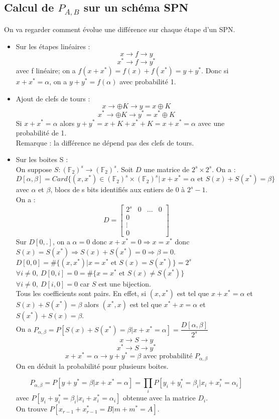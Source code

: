 \documentclass[12pt,a4paper]{report}
\begin{document}
\subsection{Calcul de $P_{A,B}$ sur un schéma SPN}
On va regarder comment évolue une différence sur chaque étape d'un SPN.
\begin{itemize}
\item Sur les étapes linéaires : 
$$ x \rightarrow f \rightarrow y $$
$$ x^* \rightarrow f \rightarrow y^* $$
avec f linéaire; on a $f(x+x^*)=f(x) + f(x^*) = y+y^*$. Donc si $x+x^*=\alpha$, on a $y+y^*=f(\alpha)$ avec probabilité 1.
\item Ajout de clefs de tours :
$$ x \rightarrow \oplus K \rightarrow y = x\oplus K $$
$$ x^* \rightarrow \oplus K \rightarrow y^* = x^* \oplus K$$
Si $x+x^*=\alpha$ alors $y+y^*=x+K+x^*+K = x+x^*=\alpha $ avec une probabilité de 1.\\
Remarque : la différence ne dépend pas des clefs de tours.
\item Sur les boites S : \\
On suppose $S:(\mathbb{F}_2)^s \rightarrow (\mathbb{F}_2)^s $. Soit $D$ une matrice de $2^s \times 2^s$. On a :
$$ D[\alpha,\beta] = Card\{(x,x^*)\in (\mathbb{F}_2)^s\times (\mathbb{F}_2)^s |\ x+x^*=\alpha \mbox{ et } S(x)+S(x^*)=\beta\}$$
avec $\alpha$ et $\beta$, blocs de s bits identifiés aux entiers de 0 à $2^s-1$.\\
On a :
$$ D = \left[\begin{array}{cccc}
2^s & 0 & \ldots & 0 \\
0 & & & \\
\vdots & & & \\
0 & & & \end{array}\right]$$
Sur $D[0,.]$, on a $\alpha=0$ donc $x+x^*=0 \Rightarrow x=x^*$ donc $S(x)=S(x^*) \Rightarrow S(x) +S(x^*) = 0 \Rightarrow \beta =0$.\\
$D[0,0] = \#\{(x,x^*) | x=x^* \mbox{ et } S(x)= S(x^*)\} = 2^s $\\
$\forall i \neq 0,\ D[0,i] = 0 = \#\{x=x^* \mbox{ et } S(x)\neq S(x^*)\}$\\
$ \forall i \neq 0, \ D[i,0]=0$ car $S$ est une bijection.\\
Tous les coefficients sont pairs. En effet, si $(x,x^*)$ est tel que $x+x^*=\alpha$ et $S(x)+S(x^*)=\beta$ alors $(x^*,x)$ est tel que $x^*+x=\alpha$ et $S(x^*)+S(x)=\beta$.\\
On a $P_{\alpha,\beta} = P[S(x)+S(x^*)=\beta | x+x^*=\alpha] = \dfrac{D[\alpha,\beta]}{2^s} $
$$ x \rightarrow S \rightarrow y $$
$$ x^* \rightarrow S \rightarrow y^* $$
$$ x+x^* = \alpha \rightarrow y+y^* = \beta \mbox{ avec probabilité } P_{\alpha,\beta} $$
On en déduit la probabilité pour plusieurs boites.
\begin{center}
  \scalebox{0.6}{}	
\end{center}

$$P_{\alpha,\beta} =P[y+y^*=\beta | x+x^*=\alpha] = \prod_{i} P[y_i+y_i^*=\beta_i | x_i+x_i^* = \alpha_i]$$
avec $P[y_i+y_i^*=\beta_i | x_i+x_i^* = \alpha_i]$ obtenue avec la matrice $D_i$.\\
On trouve $P[x_{r-1}+x_{r-1}^* = B | m+m^* = A]$.
\end{itemize}
\end{document}
